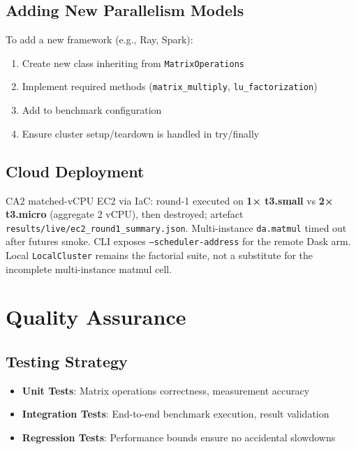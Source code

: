 \subsection{Adding New Parallelism Models}

To add a new framework (e.g., Ray, Spark):

\begin{enumerate}
    \item Create new class inheriting from \texttt{MatrixOperations}
    \item Implement required methods (\texttt{matrix\_multiply}, \texttt{lu\_factorization})
    \item Add to benchmark configuration
    \item Ensure cluster setup/teardown is handled in try/finally
\end{enumerate}

\subsection{Cloud Deployment}

CA2 matched-vCPU EC2 via IaC: round-1 executed on \textbf{1× t3.small} vs \textbf{2× t3.micro} (aggregate 2 vCPU), then destroyed; artefact \texttt{results/live/ec2\_round1\_summary.json}. Multi-instance \texttt{da.matmul} timed out after futures smoke. CLI exposes \texttt{--scheduler-address} for the remote Dask arm. Local \texttt{LocalCluster} remains the factorial suite, not a substitute for the incomplete multi-instance matmul cell.

\section{Quality Assurance}

\subsection{Testing Strategy}

\begin{itemize}
    \item \textbf{Unit Tests}: Matrix operations correctness, measurement accuracy
    \item \textbf{Integration Tests}: End-to-end benchmark execution, result validation
    \item \textbf{Regression Tests}: Performance bounds ensure no accidental slowdowns
\end{itemize}


